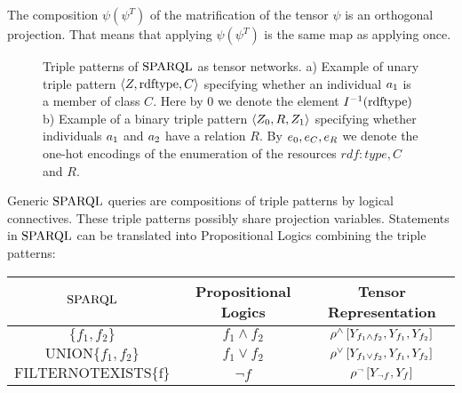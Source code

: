 The composition $\psi (\psi^T)$ of the matrification of the tensor $\psi$ is an orthogonal projection.
That means that applying $\psi (\psi^T)$ is the same map as applying once.


\begin{figure}[h]
    \begin{center}
        
    \end{center}
    \caption{Triple patterns of $\mathrm{SPARQL}$ as tensor networks.
    a) Example of unary triple pattern $\braket{Z,\mathrm{rdftype},C}$ specifying whether an individual $a_{1}$ is a member of class $C$.
    Here by $0$ we denote the element $I^{-1}(\mathrm{rdftype})$
        b) Example of a binary triple pattern $\braket{Z_{0},R,Z_{1}}$ specifying whether individuals $a_{1}$ and $a_{2}$ have a relation $R$.
        By $e_{0},e_{C},e_{R}$ we denote the one-hot encodings of the enumeration of the resources $rdf:type, C$ and $R$.}
    \label{fig:triplePatterns}
\end{figure}





Generic $\mathrm{SPARQL}$ queries are compositions of triple patterns by logical connectives. %
These triple patterns possibly share projection variables.
Statements in $\mathrm{SPARQL}$ can be translated into Propositional Logics combining the triple patterns:
\begin{center}
    \begin{tabular}{|c|c|c|}
        \hline
        \textbf{$\mathrm{SPARQL}$}                & \textbf{Propositional Logics} & \textbf{Tensor Representation}                                                                   \\
        \hline
        $\{f_1, f_2\}$                    & $f_1\land f_2$                & $\rho^{\land}\left[Y_{f_1\land f_2},Y_{f_1},Y_{f_2}\right]$ \\
        \hline
        $\mathrm{UNION}\{f_1, f_2\} $     & $f_1\lor f_2$                 & $\rho^{\lor}\left[Y_{f_1\lor f_2},Y_{f_1},Y_{f_2}\right]$   \\
        \hline
        $\mathrm{FILTER NOT EXISTS\{f\}}$ & $\lnot f$                     & $\rho^{\lnot}\left[Y_{\lnot f},Y_{f}\right]$                             \\
        \hline
    \end{tabular}
\end{center}

